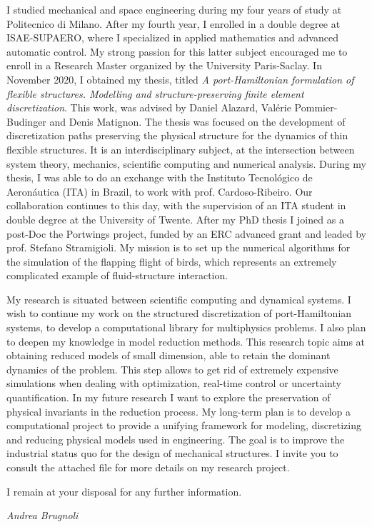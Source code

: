 \documentclass[11pt]{letter}
\begin{document}
	I studied mechanical and space engineering during my four years of study at Politecnico di Milano. After my fourth year, I enrolled in a double degree at ISAE-SUPAERO, where I specialized in applied mathematics and advanced automatic control. My strong passion for this latter subject encouraged me to enroll in a Research Master organized by the University Paris-Saclay. In November 2020, I obtained my thesis, titled \textit{A port-Hamiltonian formulation of flexible structures. Modelling and structure-preserving finite element discretization}. This work, was advised by Daniel Alazard, Valérie Pommier-Budinger and Denis Matignon. The thesis was focused on the development of discretization paths preserving the physical structure for the dynamics of thin flexible structures. It is an interdisciplinary subject, at the intersection between system theory, mechanics, scientific computing and numerical analysis. During my thesis, I was able to do an exchange with the Instituto Tecnológico de Aeronáutica (ITA) in Brazil, to work with prof. Cardoso-Ribeiro. Our collaboration continues to this day, with the supervision of an ITA student in double degree at the University of Twente. After my PhD thesis I joined as a post-Doc the Portwings project, funded by an ERC advanced grant and leaded by prof. Stefano Stramigioli. My mission is to set up the numerical algorithms for the simulation of the flapping flight of birds, which represents an extremely complicated example of fluid-structure interaction.
	
	My research is situated between scientific computing and dynamical systems. I wish to continue my work on the structured discretization of port-Hamiltonian systems, to develop a computational library for multiphysics problems. I also plan to deepen my knowledge in model reduction methods. This research topic aims at obtaining reduced models of small dimension, able to retain the dominant dynamics of the problem. This step allows to get rid of extremely expensive simulations when dealing with optimization, real-time control or uncertainty quantification. In my future research I want to explore the preservation of physical invariants in the reduction process. My long-term plan is to develop a computational project to provide a unifying framework for modeling, discretizing and reducing physical models used in engineering. The goal is to improve the industrial status quo for the design of mechanical structures. I invite you to consult the attached file for more details on my research project. 
	
 
	I remain at your disposal for any further information. 
	
	
	
	
	\begin{center}
		\large\textit{Andrea Brugnoli}
	\end{center}
\end{document}
